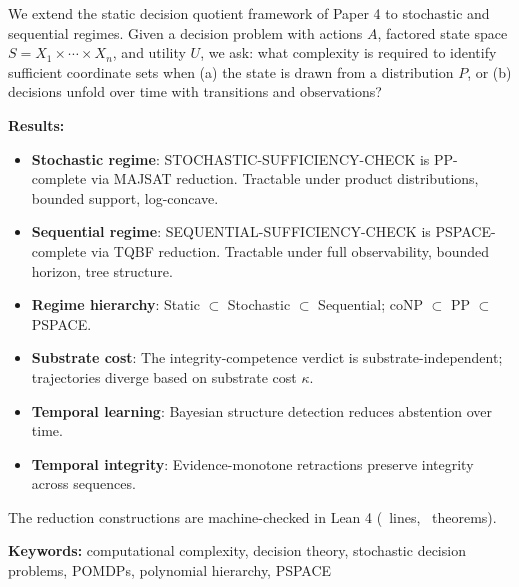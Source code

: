 We extend the static decision quotient framework of Paper 4 to stochastic and sequential regimes. Given a decision problem with actions $A$, factored state space $S = X_1 \times \cdots \times X_n$, and utility $U$, we ask: what complexity is required to identify sufficient coordinate sets when (a) the state is drawn from a distribution $P$, or (b) decisions unfold over time with transitions and observations?

\textbf{Results:}
\begin{itemize}
\item \textbf{Stochastic regime}: STOCHASTIC-SUFFICIENCY-CHECK is PP-complete via MAJSAT reduction. Tractable under product distributions, bounded support, log-concave.

\item \textbf{Sequential regime}: SEQUENTIAL-SUFFICIENCY-CHECK is PSPACE-complete via TQBF reduction. Tractable under full observability, bounded horizon, tree structure.

\item \textbf{Regime hierarchy}: Static $\subset$ Stochastic $\subset$ Sequential; coNP $\subset$ PP $\subset$ PSPACE.

\item \textbf{Substrate cost}: The integrity-competence verdict is substrate-independent; trajectories diverge based on substrate cost $\kappa$.

\item \textbf{Temporal learning}: Bayesian structure detection reduces abstention over time.

\item \textbf{Temporal integrity}: Evidence-monotone retractions preserve integrity across sequences.
\end{itemize}

The reduction constructions are machine-checked in Lean 4 (\LeanTotalLines\ lines, \LeanTotalTheorems\ theorems).

\textbf{Keywords:} computational complexity, decision theory, stochastic decision problems, POMDPs, polynomial hierarchy, PSPACE
